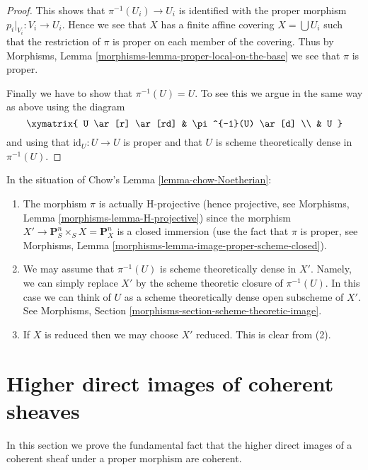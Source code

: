 \begin{proof}
\medskip\noindent
This shows that $\pi^{-1}(U_i) \to U_i$ is identified with the proper
morphism $p_i|_{V_i} : V_i \to U_i$. Hence we see that $X$ has a
finite affine covering $X = \bigcup U_i$ such that the restriction
of $\pi$ is proper on each member of the covering.
Thus by Morphisms, Lemma \ref{morphisms-lemma-proper-local-on-the-base}
we see that $\pi$ is proper.

\medskip\noindent
Finally we have to show that $\pi^{-1}(U) = U$. To see this we argue in the
same way as above using the diagram
$$
\xymatrix{
U \ar[r] \ar[rd] & \pi^{-1}(U) \ar[d] \\
& U
}
$$
and using that $\text{id}_U : U \to U$ is proper and that
$U$ is scheme theoretically dense in $\pi^{-1}(U)$.
\end{proof}

\begin{remark}
\label{remark-chow-Noetherian}
In the situation of Chow's
Lemma \ref{lemma-chow-Noetherian}:
\begin{enumerate}
\item The morphism $\pi$ is actually H-projective (hence projective, see
Morphisms, Lemma \ref{morphisms-lemma-H-projective})
since the morphism $X' \to \mathbf{P}^n_S \times_S X = \mathbf{P}^n_X$
is a closed immersion (use the fact that $\pi$ is proper, see
Morphisms, Lemma \ref{morphisms-lemma-image-proper-scheme-closed}).
\item We may assume that $\pi^{-1}(U)$ is scheme theoretically dense
in $X'$. Namely, we can simply replace $X'$ by the scheme theoretic
closure of $\pi^{-1}(U)$. In this case we can think of $U$ as a
scheme theoretically dense open subscheme of $X'$.
See Morphisms, Section \ref{morphisms-section-scheme-theoretic-image}.
\item If $X$ is reduced then we may choose $X'$ reduced. This is clear
from (2).
\end{enumerate}
\end{remark}






\section{Higher direct images of coherent sheaves}
\label{section-proper-pushforward}

\noindent
In this section we prove the fundamental fact that the higher
direct images of a coherent sheaf under a proper morphism
are coherent.

